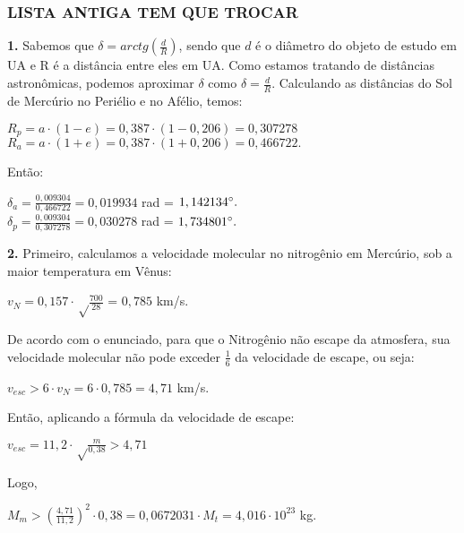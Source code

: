 \documentclass[12pt,letterpaper]{article}
\begin{document}
	\part{}
		\section{LISTA ANTIGA TEM QUE TROCAR}
		\textbf{1.} Sabemos que $\delta = arctg (\frac{d}{R})$, sendo que $d$ é o diâmetro do objeto de estudo em UA e R é a distância entre eles em UA. Como estamos tratando de distâncias astronômicas, podemos aproximar $\delta$ como $\delta = \frac{d}{R}$. Calculando as distâncias do Sol de Mercúrio no Periélio e no Afélio, temos: \\
		\begin{center}
		$R_p = a\cdot (1-e) = 0,387 \cdot (1-0,206) = 0,307278$ \\
		$R_a = a\cdot (1+e) = 0,387 \cdot (1+0,206) = 0,466722.$ 
		\end{center}
		Então:
		\begin{center}
		$\delta_a = \frac{0,009304}{0,466722} = 0,019934$ rad = $ 1,142134\degree.$ \\
		$\delta_p = \frac{0,009304}{0,307278} = 0,030278$ rad = $ 1,734801\degree.$
		\end{center} 
		
		\textbf{2.}  Primeiro, calculamos a velocidade molecular no nitrogênio em Mercúrio, sob a maior temperatura em Vênus: 
		\begin{center}
		$v_N = 0,157 \cdot \sqrt\frac{700}{28}$ = $0,785$ km/s.
		\end{center} 
	    De acordo com o enunciado, para que o Nitrogênio não escape da atmosfera, sua velocidade molecular não pode exceder $\frac{1}{6}$ da velocidade de escape, ou seja:
	    \begin{center}
	    $v_{esc} > 6 \cdot v_N = 6 \cdot 0,785 = 4,71$ km/s.
	    \end{center}
	    Então, aplicando a fórmula da velocidade de escape: 
	    \begin{center}
	    $v_{esc} = 11,2 \cdot \sqrt \frac{m}{0,38} > 4,71$
	    \end{center}  Logo, 
	    \begin{center}
	    $ M_m > (\frac{4,71}{11,2})^2 \cdot 0,38 = 0,0672031 \cdot M_t = 4,016 \cdot 10^{23}$ kg. 
	    \end{center}
	    
\end{document}
